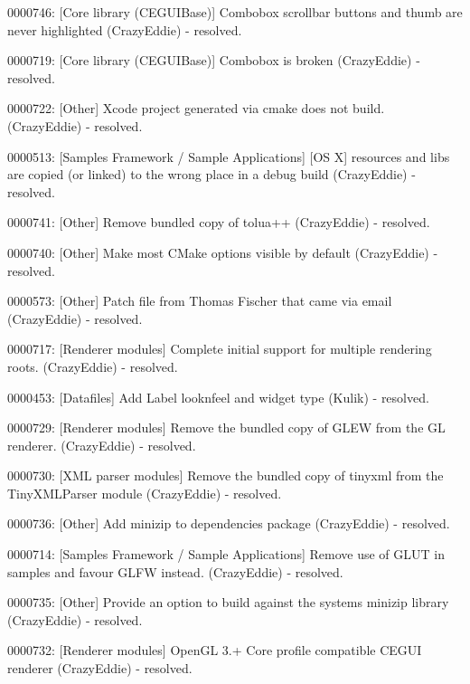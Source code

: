 \begin{DoxyItemize}
\item 0000746\+: \mbox{[}Core library (C\+E\+G\+U\+I\+Base)\mbox{]} Combobox scrollbar buttons and thumb are never highlighted (Crazy\+Eddie) -\/ resolved.
\item 0000719\+: \mbox{[}Core library (C\+E\+G\+U\+I\+Base)\mbox{]} Combobox is broken (Crazy\+Eddie) -\/ resolved.
\item 0000722\+: \mbox{[}Other\mbox{]} Xcode project generated via cmake does not build. (Crazy\+Eddie) -\/ resolved.
\item 0000513\+: \mbox{[}Samples Framework / Sample Applications\mbox{]} \mbox{[}OS X\mbox{]} resources and libs are copied (or linked) to the wrong place in a debug build (Crazy\+Eddie) -\/ resolved.
\item 0000741\+: \mbox{[}Other\mbox{]} Remove bundled copy of tolua++ (Crazy\+Eddie) -\/ resolved.
\item 0000740\+: \mbox{[}Other\mbox{]} Make most C\+Make options visible by default (Crazy\+Eddie) -\/ resolved.
\item 0000573\+: \mbox{[}Other\mbox{]} Patch file from Thomas Fischer that came via email (Crazy\+Eddie) -\/ resolved.
\item 0000717\+: \mbox{[}Renderer modules\mbox{]} Complete initial support for multiple rendering roots. (Crazy\+Eddie) -\/ resolved.
\item 0000453\+: \mbox{[}Datafiles\mbox{]} Add Label looknfeel and widget type (Kulik) -\/ resolved.
\item 0000729\+: \mbox{[}Renderer modules\mbox{]} Remove the bundled copy of G\+L\+EW from the GL renderer. (Crazy\+Eddie) -\/ resolved.
\item 0000730\+: \mbox{[}X\+ML parser modules\mbox{]} Remove the bundled copy of tinyxml from the Tiny\+X\+M\+L\+Parser module (Crazy\+Eddie) -\/ resolved.
\item 0000736\+: \mbox{[}Other\mbox{]} Add minizip to dependencies package (Crazy\+Eddie) -\/ resolved.
\item 0000714\+: \mbox{[}Samples Framework / Sample Applications\mbox{]} Remove use of G\+L\+UT in samples and favour G\+L\+FW instead. (Crazy\+Eddie) -\/ resolved.
\item 0000735\+: \mbox{[}Other\mbox{]} Provide an option to build against the system\textquotesingle{}s minizip library (Crazy\+Eddie) -\/ resolved.
\item 0000732\+: \mbox{[}Renderer modules\mbox{]} Open\+GL 3.+ Core profile compatible C\+E\+G\+UI renderer (Crazy\+Eddie) -\/ resolved.

\end{DoxyItemize}
